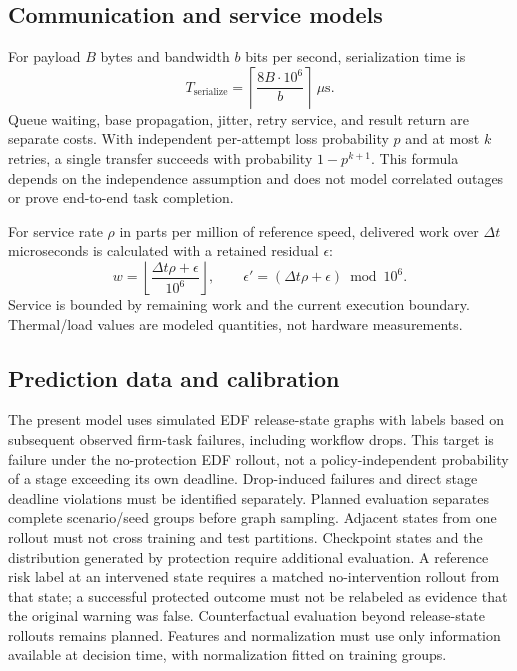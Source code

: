 \documentclass[11pt,a4paper]{article}
\begin{document}
\subsection{Communication and service models}
For payload $B$ bytes and bandwidth $b$ bits per second, serialization time is
\begin{equation}
 T_{\mathrm{serialize}}=\left\lceil\frac{8B\cdot10^6}{b}\right\rceil\ \mu\mathrm{s}.
\end{equation}
Queue waiting, base propagation, jitter, retry service, and result return are
separate costs. With independent per-attempt loss probability $p$ and at most
$k$ retries, a single transfer succeeds with probability $1-p^{k+1}$.
This formula depends on the independence assumption and does not model
correlated outages or prove end-to-end task completion.

For service rate $\rho$ in parts per million of reference speed, delivered work
over $\Delta t$ microseconds is calculated with a retained residual $\epsilon$:
\begin{equation}
 w=\left\lfloor\frac{\Delta t\rho+\epsilon}{10^6}\right\rfloor,\qquad
 \epsilon'=(\Delta t\rho+\epsilon)\bmod10^6.
\end{equation}
Service is bounded by remaining work and the current execution boundary.
Thermal/load values are modeled quantities, not hardware measurements.

\subsection{Prediction data and calibration}
The present model uses simulated EDF release-state graphs with labels based on
subsequent observed firm-task failures, including workflow drops. This target is
failure under the no-protection EDF rollout, not a policy-independent probability
of a stage exceeding its own deadline. Drop-induced failures and direct stage
deadline violations must be identified separately. Planned evaluation separates complete
scenario/seed groups before graph sampling. Adjacent states from one rollout
must not cross training and test partitions. Checkpoint states and the
distribution generated by protection require additional evaluation. A reference
risk label at an intervened state requires a matched no-intervention rollout from
that state; a successful protected outcome must not be relabeled as evidence that
the original warning was false. Counterfactual evaluation beyond release-state
rollouts remains planned. Features and normalization must use only information
available at decision time, with normalization fitted on training groups.
\end{document}
